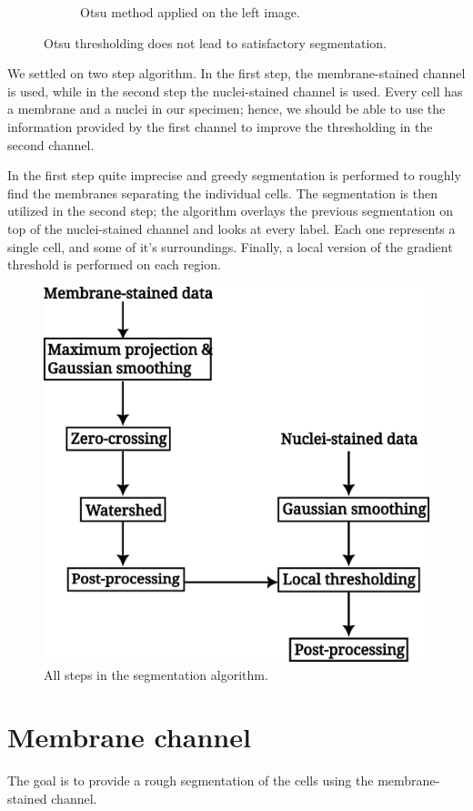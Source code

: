 \documentclass[
  digital,     %
  oneside,     %
  nosansbold,  %
  nocolorbold, %
  lof,         %
  lot,         %
]{fithesis4}
\begin{document}
\begin{figure}
\begin{subfigure}[t]{0.45\textwidth}
        \caption{Otsu method applied on the left image.}
        \label{fig:otsu-naive}
    \end{subfigure}
    \caption{Otsu thresholding does not lead to satisfactory segmentation.}
    \label{fig:otsu-nuclei-demo}
\end{figure}
We settled on two step algorithm. In the first step, the membrane-stained
channel is used, while in the second step the nuclei-stained channel is used.
Every cell has a membrane and a nuclei in our specimen; hence, we should be able
to use the information provided by the first channel to improve the thresholding
in the second channel.

In the first step quite imprecise and greedy segmentation is performed to
roughly find the membranes separating the individual cells. The segmentation is
then utilized in the second step; the algorithm overlays the previous
segmentation on top of the nuclei-stained channel and looks at every label.
Each one represents a single cell, and some of it's surroundings. Finally, a
local version of the gradient threshold is performed on each region.
\begin{figure}
    \begin{center}
        \includegraphics[width=0.8\linewidth]{./resources/inkscape/segmentation-steps.png}
    \end{center}
    \caption{All steps in the segmentation algorithm.}
    \label{fig:segmentation_steps}
\end{figure}

\section{Membrane channel}
The goal is to provide a rough segmentation of the cells using the
membrane-stained channel.
\end{document}
